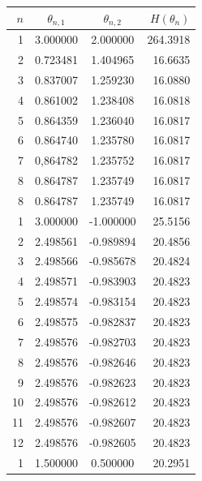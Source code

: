 \documentclass{abnt}
\begin{document}
\begin{table}
        \begin{center}
                \begin{tabular}{ r | c c r  }
                        \hline
                        $n$ & $\theta_{n,1}$ & $\theta_{n,2}$ & $H(\theta_n)$ \\
                        \hline
                        1 & 3.000000 & 2.000000 & 264.3918 \\
                        2 & 0.723481& 1.404965 & 16.6635 \\
                        3 & 0.837007 & 1.259230 & 16.0880 \\
                        4 & 0.861002 & 1.238408 & 16.0818 \\
                        5 & 0.864359 & 1.236040 & 16.0817 \\
                        6 & 0.864740 & 1.235780 & 16.0817 \\
                        7 & 0,864782 & 1.235752 & 16.0817 \\
                        8 & 0.864787 & 1.235749 & 16.0817 \\
                        8 & 0.864787 & 1.235749 & 16.0817 \\
                        \hline
                        1 & 3.000000 & -1.000000 & 25.5156 \\
                        2 & 2.498561 & -0.989894 & 20.4856 \\
                        3 & 2.498566 & -0.985678 & 20.4824 \\
                        4 & 2.498571 & -0.983903 & 20.4823 \\
                        5 & 2.498574 & -0.983154 & 20.4823 \\
                        6 & 2.498575 & -0.982837 & 20.4823 \\
                        7 & 2.498576 & -0.982703 & 20.4823 \\
                        8 & 2.498576 & -0.982646 & 20.4823 \\
                        9 & 2.498576 & -0.982623 & 20.4823 \\
                        10 & 2.498576 & -0.982612 & 20.4823 \\
                        11 & 2.498576 & -0.982607 & 20.4823 \\
                        12 & 2.498576 & -0.982605 & 20.4823 \\
                        \hline
                        1 & 1.500000 & 0.500000 & 20.2951 \\

\end{tabular}
\end{center}
\end{table}
\end{document}
